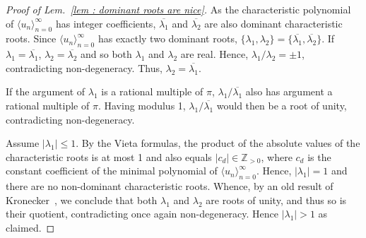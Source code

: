 \documentclass[a4paper,UKenglish,cleveref, autoref, thm-restate]{lipics-v2021}
\begin{document}
\begin{proof}[Proof of Lem.~\ref{lem : dominant roots are nice}]
    As the characteristic polynomial of $\langle u_n\rangle_{n=0}^\infty$ has integer coefficients, $\overline{\lambda_1}$ and $\overline{\lambda_2}$ are also dominant characteristic roots. 
   Since $\langle u_n\rangle_{n=0}^\infty$ has exactly two dominant roots, $\{\lambda_1, \lambda_2\} = \{\overline{\lambda_1}, \overline{\lambda_2}\}$. 
    If $\lambda_1 = \overline{\lambda_1}$, $\lambda_2 = \overline{\lambda_2}$ and so both $\lambda_1$ and $\lambda_2$ are real. Hence, $\lambda_1/\lambda_2 = \pm1$, contradicting non-degeneracy. 
    Thus, $\lambda_2 = \overline{\lambda_1}$.

    If the argument of $\lambda_1$ is a rational multiple of $\pi$,
    $\lambda_1/\overline{\lambda_1}$ also has argument a rational
    multiple of $\pi$. Having modulus 1,
    $\lambda_1/\overline{\lambda_1}$ would then be a root of unity,
    contradicting non-degeneracy.

    Assume $|\lambda_1| \le 1$.
    By the Vieta formulas, the product of the absolute values of the
    characteristic roots is at most 1 and also equals $|c_d| \in
    \mathbb{Z}_{>0}$, where $c_d$ is the constant coefficient of the
    minimal polynomial of $\langle u_n\rangle_{n=0}^\infty$. 
    Hence, $|\lambda_1| = 1$ and there are no non-dominant characteristic roots. 
    Whence, by an old result of Kronecker~\cite{Kronecker}, we
    conclude that both $\lambda_1$ and $\lambda_2$ are roots of unity,
    and thus so is their quotient, contradicting once again non-degeneracy.
    Hence $|\lambda_1| > 1$ as claimed.
\end{proof}
\end{document}
